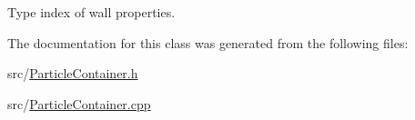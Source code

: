 Type index of wall properties. 



The documentation for this class was generated from the following files\-:\begin{DoxyCompactItemize}
\item 
src/\hyperlink{ParticleContainer_8h}{Particle\-Container.\-h}\item 
src/\hyperlink{ParticleContainer_8cpp}{Particle\-Container.\-cpp}\end{DoxyCompactItemize}
